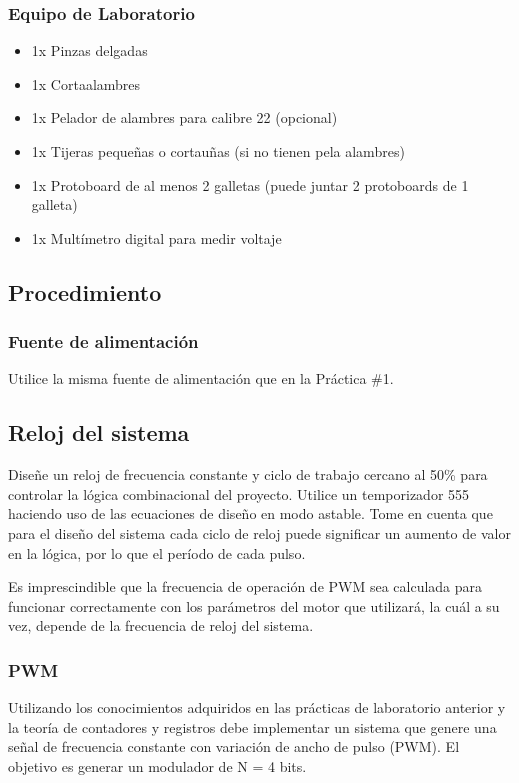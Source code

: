 \subsubsection*{Equipo de Laboratorio}
\begin{itemize}
    \item 1x Pinzas delgadas
    \item 1x Cortaalambres
    \item 1x Pelador de alambres para calibre 22 (opcional)
    \item 1x Tijeras pequeñas o cortauñas (si no tienen pela alambres)
    \item 1x Protoboard de al menos 2 galletas (puede juntar 2 protoboards de 1 galleta)
    \item 1x Multímetro digital para medir voltaje
\end{itemize}

\subsection{Procedimiento}
\subsubsection{Fuente de alimentación}
Utilice la misma fuente de alimentación que en la Práctica \#1.

\subsection{Reloj del sistema}
Diseñe un reloj de frecuencia constante y ciclo de trabajo cercano al 50\% para controlar la lógica combinacional del proyecto. Utilice un temporizador 555 haciendo uso de las 
ecuaciones de diseño en modo astable. Tome en cuenta que para el diseño del sistema cada ciclo de reloj puede significar un aumento de valor en la lógica, por lo que el período de cada pulso.

Es imprescindible que la frecuencia de operación de PWM sea calculada para funcionar correctamente con los parámetros del motor que utilizará, la cuál a su vez, 
depende de la frecuencia de reloj del sistema.

\subsubsection{PWM}
Utilizando los conocimientos adquiridos en las prácticas de laboratorio anterior y la teoría de contadores y registros debe implementar un sistema que 
genere una señal de frecuencia constante con variación de ancho de pulso (PWM). El objetivo es generar un modulador de N = 4 bits.

